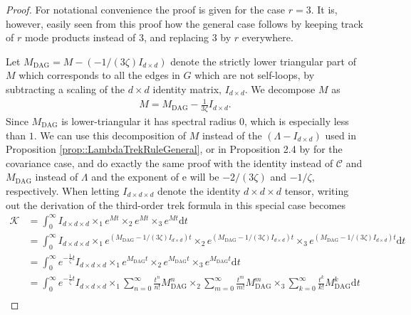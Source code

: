 \documentclass{biometrika}
\begin{document}
\begin{proof}
    For notational convenience the proof is given for the case $r = 3$. It is, however, 
    easily seen from this proof how the general case follows by keeping track of 
    $r$ mode products instead of $3$, and replacing $3$ by $r$ everywhere.  
    
    Let $M_{\mathrm{DAG}} = M - (-1/(3 \zeta) I_{d\times d})$ denote the strictly lower triangular part of $M$ which corresponds to all the edges in $G$ which are not self-loops, by subtracting a scaling of the $d \times d$ identity matrix, $I_{d \times d}$. We decompose $M$ as
    \begin{align*}
        M = M_{\mathrm{DAG}}-\frac{1}{3 \zeta} I_{d \times d}.  
    \end{align*}
    Since $M_{\mathrm{DAG}}$ is lower-triangular it has spectral radius $0$, which is 
    especially less than $1$. We can use this decomposition of $M$ instead of the $(\Lambda - I_{d \times d})$ used in Proposition \ref{prop::LambdaTrekRuleGeneral}, or in Proposition 2.4 by \cite{hansen2024trekrulelyapunovequation} for the covariance case, and do exactly the same proof with the identity instead of $\mathcal{C}$ and $M_{\mathrm{DAG}}$ instead of $\Lambda$ and the exponent of $\mathrm{e}$ will be $-2/(3 \zeta)$ and $-1/\zeta$, respectively. When letting $I_{d \times d \times d}$ denote the identity $d \times d \times d$ tensor, writing out the derivation of the third-order trek formula in this special case becomes
        \begin{align*}
        \mathcal{K}  &= \int_{0}^{\infty} I_{d \times d \times d} \times_1 e^{M t} \times_2 e^{M t} \times_{3} e^{M t} \mathrm{d} t \\ 
        &= \int_{0}^{\infty} I_{d \times d \times d} \times_1 e^{(M_{\mathrm{DAG}}-1/(3 \zeta) I_{d \times d}) t} \times_2 e^{(M_{\mathrm{DAG}}-1/(3 \zeta) I_{d \times d}) t}  \times_{3} e^{(M_{\mathrm{DAG}}-1/(3 \zeta) I_{d \times d}) t} \mathrm{d} t \\ 
        &= \int_{0}^{\infty} e^{- \frac{1}{\zeta} t }  I_{d \times d \times d} \times_1 e^{M_{\mathrm{DAG}} t} \times_2 e^{M_{\mathrm{DAG}} t}  \times_{3} e^{M_{\mathrm{DAG}} t} \mathrm{d} t \\
        &= \int_{0}^{\infty} e^{- \frac{1}{\zeta} t }  I_{d \times d \times d} \times_1 \sum_{n = 0}^{\infty} \frac{t^n}{n!} M_{\mathrm{DAG}}^n \times_2 
        \sum_{m = 0}^{\infty} \frac{t^m}{m!} M_{\mathrm{DAG}}^m \times_3  \sum_{k = 0}^{\infty} \frac{t^k}{k!} M_{\mathrm{DAG}}^k \mathrm{d} t \\ 

\end{align*}
\end{proof}
\end{document}
